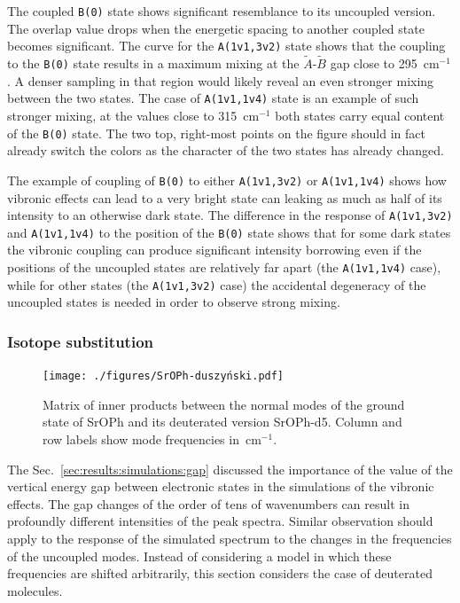 \documentclass{article}
\begin{document}
The coupled \texttt{B(0)} state shows significant resemblance to its uncoupled
version. The overlap value drops when the energetic spacing to another coupled
state becomes significant. The curve for the \texttt{A(1v1,3v2)} state shows
that the coupling to the \texttt{B(0)} state results in a maximum mixing at the
$\tilde{A}$-$\tilde{B}$ gap close to 295~cm$^{-1}$. A denser sampling in that
region would likely reveal an even stronger mixing between the two states. The
case of \texttt{A(1v1,1v4)} state is an example of such stronger mixing, at the
values close to 315~cm$^{-1}$ both states carry equal content of the
\texttt{B(0)} state. The two top, right-most points on the figure should in
fact already switch the colors as the character of the two states has already
changed.

The example of coupling of \texttt{B(0)} to either \texttt{A(1v1,3v2)} or
\texttt{A(1v1,1v4)} shows how vibronic effects can lead to a very bright state
can leaking as much as half of its intensity to an otherwise dark state. The
difference in the response of \texttt{A(1v1,3v2)} and \texttt{A(1v1,1v4)} to
the position of the \texttt{B(0)} state shows that for some dark states the
vibronic coupling can produce significant intensity borrowing even if the
positions of the uncoupled states are relatively far apart (the
\texttt{A(1v1,1v4)} case), while for other states (the \texttt{A(1v1,3v2)}
case) the accidental degeneracy of the uncoupled states is needed in order to
observe strong mixing.


\subsubsection{Isotope substitution}
\label{sec:results:simulations:isotope}

\begin{figure}
    \begin{center}
        \texttt{[image: ./figures/SrOPh-duszyński.pdf]}
    \end{center}
    \caption{
        Matrix of inner products between the normal modes of the ground state
        of SrOPh and its deuterated version SrOPh-d5. Column and row labels
        show mode frequencies in~cm$^{-1}$.
    }
    \label{fig:sroph_duszynski}
\end{figure}

The Sec.~\ref{sec:results:simulations:gap} discussed the importance of the
value of the vertical energy gap between electronic states in the simulations
of the vibronic effects. The gap changes of the order of tens of wavenumbers
can result in profoundly different intensities of the peak spectra. Similar
observation should apply to the response of the simulated spectrum to the
changes in the frequencies of the uncoupled modes. Instead of considering a
model in which these frequencies are shifted arbitrarily, this section
considers the case of deuterated molecules.
\end{document}
